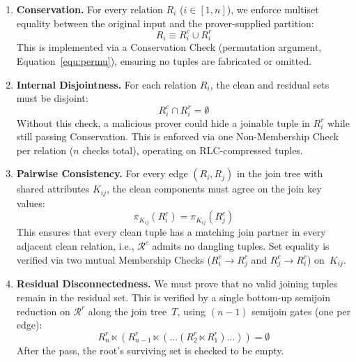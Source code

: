 \documentclass[sigconf]{acmart}
\begin{document}
\begin{enumerate}
    \item \textbf{Conservation.}
    For every relation $R_i$ ($i \in [1, n]$), we enforce multiset equality between the original input and the prover-supplied partition:
\vspace{-0.1in}
    \begin{equation}
        R_i \equiv R_i^c \cup R_i^r
    \end{equation}
    This is implemented via a Conservation Check (permutation argument, Equation~\eqref{equ:permu}), ensuring no tuples are fabricated or omitted.

    \item \textbf{Internal Disjointness.}
    For each relation $R_i$, the clean and residual sets must be disjoint:
    \begin{equation}
        R_i^c \cap R_i^r = \emptyset
    \end{equation}
    Without this check, a malicious prover could hide a joinable tuple in $R_i^r$ while still passing Conservation. This is enforced via one Non-Membership Check per relation ($n$ checks total), operating on RLC-compressed tuples.

    \item \textbf{Pairwise Consistency.}
    For every edge $(R_i, R_j)$ in the join tree with shared attributes $K_{ij}$, the clean components must agree on the join key values:
    \begin{equation}
        \pi_{K_{ij}}(R_i^c) = \pi_{K_{ij}}(R_j^c)
    \end{equation}
    This ensures that every clean tuple has a matching join partner in every adjacent clean relation, i.e., $\mathcal{R}^c$ admits no dangling tuples. Set equality is verified via two mutual Membership Checks ($R_i^c \to R_j^c$ and $R_j^c \to R_i^c$) on~$K_{ij}$.

    \item \textbf{Residual Disconnectedness.}
    We must prove that no valid joining tuples remain in the residual set. This is verified by a single bottom-up semijoin reduction on $\mathcal{R}^r$ along the join tree~$T$, using $(n{-}1)$ semijoin gates (one per edge):
    \begin{equation}
        R_n^r \ltimes (R_{n-1}^r \ltimes (\dots (R_2^r \ltimes R_1^r)\dots)) = \emptyset
    \end{equation}
    After the pass, the root's surviving set is checked to be empty.
\end{enumerate}
\end{document}
